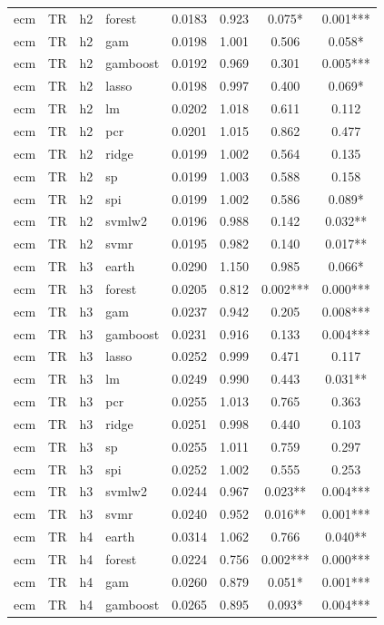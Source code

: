 \begin{ThreePartTable}
\begin{longtable}[t]{llclcccc}
ecm & TR & h2 & forest & 0.0183 & 0.923 & 0.075* & 0.001***\\
ecm & TR & h2 & gam & 0.0198 & 1.001 & 0.506 & 0.058*\\
ecm & TR & h2 & gamboost & 0.0192 & 0.969 & 0.301 & 0.005***\\
ecm & TR & h2 & lasso & 0.0198 & 0.997 & 0.400 & 0.069*\\
ecm & TR & h2 & lm & 0.0202 & 1.018 & 0.611 & 0.112\\
ecm & TR & h2 & pcr & 0.0201 & 1.015 & 0.862 & 0.477\\
ecm & TR & h2 & ridge & 0.0199 & 1.002 & 0.564 & 0.135\\
ecm & TR & h2 & sp & 0.0199 & 1.003 & 0.588 & 0.158\\
ecm & TR & h2 & spi & 0.0199 & 1.002 & 0.586 & 0.089*\\
ecm & TR & h2 & svmlw2 & 0.0196 & 0.988 & 0.142 & 0.032**\\
ecm & TR & h2 & svmr & 0.0195 & 0.982 & 0.140 & 0.017**\\
\addlinespace
ecm & TR & h3 & earth & 0.0290 & 1.150 & 0.985 & 0.066*\\
ecm & TR & h3 & forest & 0.0205 & 0.812 & 0.002*** & 0.000***\\
ecm & TR & h3 & gam & 0.0237 & 0.942 & 0.205 & 0.008***\\
ecm & TR & h3 & gamboost & 0.0231 & 0.916 & 0.133 & 0.004***\\
ecm & TR & h3 & lasso & 0.0252 & 0.999 & 0.471 & 0.117\\
ecm & TR & h3 & lm & 0.0249 & 0.990 & 0.443 & 0.031**\\
ecm & TR & h3 & pcr & 0.0255 & 1.013 & 0.765 & 0.363\\
ecm & TR & h3 & ridge & 0.0251 & 0.998 & 0.440 & 0.103\\
ecm & TR & h3 & sp & 0.0255 & 1.011 & 0.759 & 0.297\\
ecm & TR & h3 & spi & 0.0252 & 1.002 & 0.555 & 0.253\\
ecm & TR & h3 & svmlw2 & 0.0244 & 0.967 & 0.023** & 0.004***\\
ecm & TR & h3 & svmr & 0.0240 & 0.952 & 0.016** & 0.001***\\
\addlinespace
ecm & TR & h4 & earth & 0.0314 & 1.062 & 0.766 & 0.040**\\
ecm & TR & h4 & forest & 0.0224 & 0.756 & 0.002*** & 0.000***\\
ecm & TR & h4 & gam & 0.0260 & 0.879 & 0.051* & 0.001***\\
ecm & TR & h4 & gamboost & 0.0265 & 0.895 & 0.093* & 0.004***\\

\end{longtable}
\end{ThreePartTable}
